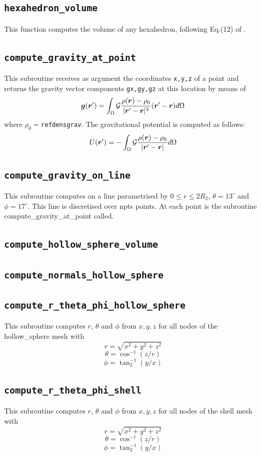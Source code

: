  \subsection{\tt hexahedron\_volume}
 This function computes the volume of any hexahedron, 
 following Eq.(12) of \cite{gran97}.
 \subsection{\tt compute\_gravity\_at\_point}
 This subroutine receives as argument the coordinates {\tt x,y,z} of a point and 
 returns the gravity vector components {\tt gx,gy,gz} at this location 
 by means of 
 \[
 {\bm g}({\bm r}') = \int_\Omega {\cal G} \frac{\rho({\bm r})-\rho_0}{|{\bm r}'-{\bm r}|^3} ({\bm r}'-{\bm r}) d\Omega
 \] 
 where $\rho_0=${\tt refdensgrav}.
 The gravitational potential is computed as follows:
 \[
 U({\bm r}') = -\int_\Omega {\cal G} \frac{\rho({\bm r})-\rho_0}{|{\bm r}'-{\bm r}|}  d\Omega
 \]
 \subsection{\tt compute\_gravity\_on\_line}
 This subroutine computes on a line parametrised by $0\leq r \leq 2R_2$,
 $\theta=13^\circ$ and $\phi=17^\circ$. This line is discretised 
 over npts points. At each point is the subroutine compute\_gravity\_at\_point called.
 \subsection{\tt compute\_hollow\_sphere\_volume}
 \subsection{\tt compute\_normals\_hollow\_sphere}
 \subsection{\tt compute\_r\_theta\_phi\_hollow\_sphere}
 This subroutine computes $r$, $\theta$ and $\phi$ from $x,y,z$ for all 
 nodes of the hollow\_sphere mesh with
 \[
 r=\sqrt{x^2+y^2+z^2}
 \]
 \[
 \theta=\cos^{-1}(z/r)
 \]
 \[
 \phi=\tan^{-1}_2 (y/x)
 \]
 \subsection{\tt compute\_r\_theta\_phi\_shell}
 This subroutine computes $r$, $\theta$ and $\phi$ from $x,y,z$ for all 
 nodes of the shell mesh with
 \[
 r=\sqrt{x^2+y^2+z^2}
 \]
 \[
 \theta=\cos^{-1}(z/r)
 \]
 \[
 \phi=\tan^{-1}_2 (y/x)
 \]

